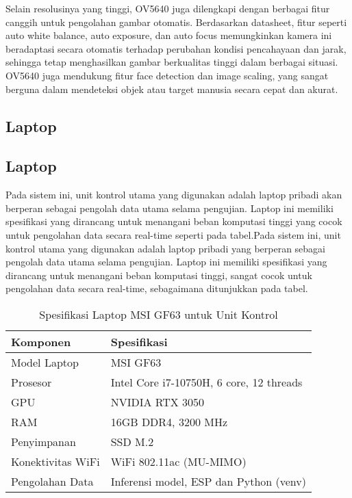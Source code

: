 Selain resolusinya yang tinggi, OV5640 juga dilengkapi dengan berbagai fitur canggih untuk pengolahan gambar otomatis. Berdasarkan datasheet, fitur seperti auto white balance, auto exposure, dan auto focus memungkinkan kamera ini beradaptasi secara otomatis terhadap perubahan kondisi pencahayaan dan jarak, sehingga tetap menghasilkan gambar berkualitas tinggi dalam berbagai situasi. OV5640 juga mendukung fitur face detection dan image scaling, yang sangat berguna dalam mendeteksi objek atau target manusia secara cepat dan akurat.
\subsection{Laptop}

\subsection{Laptop}
\label{subsec:laptop}
Pada sistem ini, unit kontrol utama yang digunakan adalah laptop pribadi akan berperan sebagai pengolah data utama selama pengujian. Laptop ini memiliki spesifikasi yang dirancang untuk menangani beban komputasi tinggi yang cocok untuk pengolahan data secara real-time seperti pada tabel.Pada sistem ini, unit kontrol utama yang digunakan adalah laptop pribadi yang berperan sebagai pengolah data utama selama pengujian. Laptop ini memiliki spesifikasi yang dirancang untuk menangani beban komputasi tinggi, sangat cocok untuk pengolahan data secara real-time, sebagaimana ditunjukkan pada tabel.

\begin{table}[H]
  \centering
  \caption{Spesifikasi Laptop MSI GF63 untuk Unit Kontrol}
  \begin{tabular}{|l|l|}
  \hline
  \textbf{Komponen}       & \textbf{Spesifikasi}                     \\ \hline
  Model Laptop            & MSI GF63                                 \\ \hline
  Prosesor                & Intel Core i7-10750H, 6 core, 12 threads \\ \hline
  GPU                     & NVIDIA RTX 3050                          \\ \hline
  RAM                     & 16GB DDR4, 3200 MHz                      \\ \hline
  Penyimpanan             & SSD M.2                                  \\ \hline
  Konektivitas WiFi       & WiFi 802.11ac (MU-MIMO)                  \\ \hline
  Pengolahan Data         & Inferensi model, ESP dan Python (venv)   \\ \hline
  \end{tabular}
\end{table}

